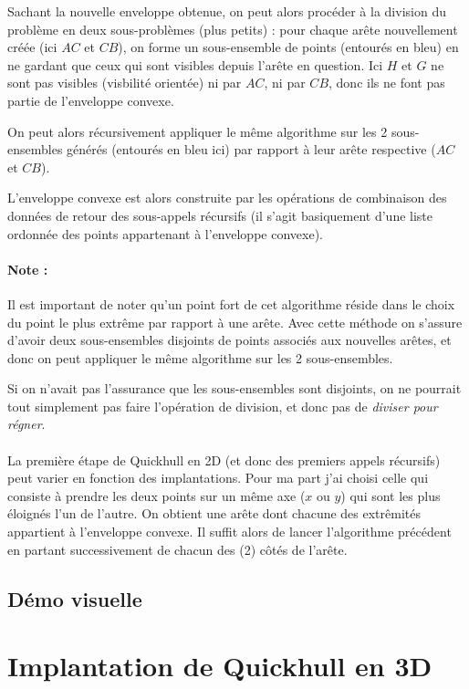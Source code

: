 \documentclass[]{article}
\begin{document}
Sachant la nouvelle enveloppe obtenue, on peut alors procéder à la division du problème en deux sous-problèmes (plus petits) : pour chaque arête nouvellement créée (ici $AC$ et $CB$), on forme un sous-ensemble de points (entourés en bleu) en ne gardant que ceux qui sont visibles depuis l'arête en question. Ici $H$ et $G$ ne sont pas visibles (visbilité orientée) ni par $AC$, ni par $CB$, donc ils ne font pas partie de l'enveloppe convexe.

On peut alors récursivement appliquer le même algorithme sur les 2 sous-ensembles générés (entourés en bleu ici) par rapport à leur arête respective ($AC$ et $CB$).

L'enveloppe convexe est alors construite par les opérations de combinaison des données de retour des sous-appels récursifs (il s'agit basiquement d'une liste ordonnée des points appartenant à l'enveloppe convexe).

\paragraph{Note :}
Il est important de noter qu'un point fort de cet algorithme réside dans le choix du point le plus extrême par rapport à une arête. Avec cette méthode on s'assure d'avoir deux sous-ensembles disjoints de points associés aux nouvelles arêtes, et donc on peut appliquer le même algorithme sur les 2 sous-ensembles.

Si on n'avait pas l'assurance que les sous-ensembles sont disjoints, on ne pourrait tout simplement pas faire l'opération de division, et donc pas de \emph{diviser pour régner}.

\paragraph{}
La première étape de Quickhull en 2D (et donc des premiers appels récursifs) peut varier en fonction des implantations. Pour ma part j'ai choisi celle qui consiste à prendre les deux points sur un même axe ($x$ ou $y$) qui sont les plus éloignés l'un de l'autre. On obtient une arête dont chacune des extrêmités appartient à l'enveloppe convexe. Il suffit alors de lancer l'algorithme précédent en partant successivement de chacun des (2) côtés de l'arête.

\subsection{Démo visuelle}

\section{Implantation de Quickhull en 3D}
\end{document}
